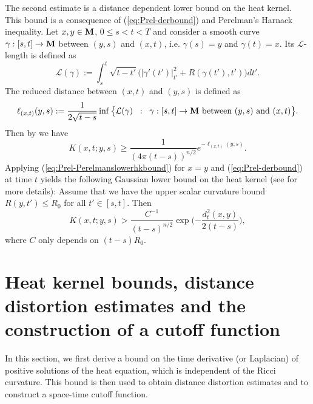 \documentclass[11pt]{amsart}
\numberwithin{equation}{section}
\def\M{{\bf M}}
\numberwithin{equation}{section}
\begin{document}
The second estimate is a distance dependent lower bound on the heat kernel.
This bound is a consequence of (\ref{eq:Prel-derbound}) and Perelman's Harnack inequality.
Let $x, y \in \M$, $0 \leq s < t < T$ and consider a smooth curve $\gamma : [s,t] \to \M$ between $(y,s)$ and $(x,t)$, i.e. $\gamma (s) = y$ and $\gamma(t) = x$.
Its $\mathcal{L}$-length is defined as
\[ \mathcal{L} (\gamma) := \int_{s}^t \sqrt{t-t'} \big( |\gamma'(t')|^2_{t'} + R(\gamma(t'), t') \big) dt'. \]
The reduced distance between $(x, t)$ and $(y,s)$ is defined as
\[ \ell_{(x,t)} (y,s) := \frac1{2\sqrt{t-s}} \inf \big\{ \mathcal{L} (\gamma) \;\; : \;\; \text{$\gamma : [s,t] \to \M$ between $(y,s)$ and $(x,t)$} \big\}. \]
Then by \cite[Corollary 9.5]{P:1} we have
\begin{equation} \label{eq:Prel-Perelmanslowerhkbound}
 K(x,t; y,s) \geq \frac{1}{(4\pi (t-s))^{n/2}} e^{- \ell_{(x,t)} (y,s)}.
\end{equation}
Applying (\ref{eq:Prel-Perelmanslowerhkbound}) for $x=y$ and (\ref{eq:Prel-derbound}) at time $t$ yields the following Gaussian lower bound on the heat kernel (see \cite{Z11:1} for more details):
Assume that we have the upper scalar curvature bound $R(y, t') \leq R_0$ for all $t' \in [s,t]$.
Then
\begin{equation} \label{eq:Prel-lowerhkbound}
 K(x,t; y,s) > \frac{C^{-1}}{(t-s)^{n/2}} \exp \bigg( {- \frac{ d_t^2(x,y)}{2(t-s)}} \bigg),
\end{equation}
where $C$ only depends on $(t-s) R_0$.

\section{Heat kernel bounds, distance distortion estimates and the construction of a cutoff function} \label{sec:heatkernelcutoff}
In this section, we first derive a bound on the time derivative (or Laplacian) of positive solutions of the heat equation, which is independent of the Ricci curvature.
This bound is then used to obtain distance distortion estimates and to construct a space-time cutoff function.
\end{document}
